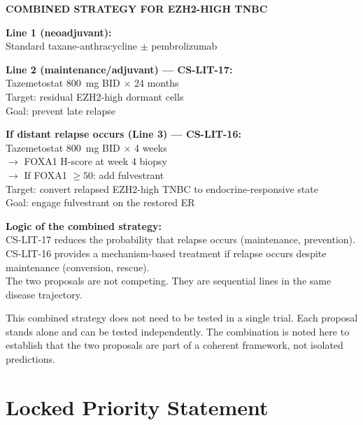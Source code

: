 \documentclass[12pt, a4paper]{article}
\begin{document}
\begin{center}
\colorbox{mechanismbox}{
\begin{minipage}{0.85\textwidth}
\vspace{0.5em}
\textbf{COMBINED STRATEGY FOR EZH2-HIGH TNBC}

\medskip
\textbf{Line 1 (neoadjuvant):}\\
Standard taxane-anthracycline $\pm$ pembrolizumab

\medskip
\textbf{Line 2 (maintenance/adjuvant) ---
CS-LIT-17:}\\
Tazemetostat 800~mg BID $\times$ 24 months\\
Target: residual EZH2-high dormant cells\\
Goal: prevent late relapse

\medskip
\textbf{If distant relapse occurs (Line 3) ---
CS-LIT-16:}\\
Tazemetostat 800~mg BID $\times$ 4 weeks\\
$\rightarrow$ FOXA1 H-score at week 4 biopsy\\
$\rightarrow$ If FOXA1 $\geq50$: add fulvestrant\\
Target: convert relapsed EZH2-high TNBC to
endocrine-responsive state\\
Goal: engage fulvestrant on the restored ER

\medskip
\textbf{Logic of the combined strategy:}\\
CS-LIT-17 reduces the probability that relapse
occurs (maintenance, prevention).\\
CS-LIT-16 provides a mechanism-based treatment
if relapse occurs despite maintenance (conversion,
rescue).\\
The two proposals are not competing. They are
sequential lines in the same disease trajectory.
\vspace{0.5em}
\end{minipage}
}
\end{center}

This combined strategy does not need to be tested
in a single trial. Each proposal stands alone
and can be tested independently. The combination
is noted here to establish that the two proposals
are part of a coherent framework, not isolated
predictions.

\section{Locked Priority Statement}
\end{document}
